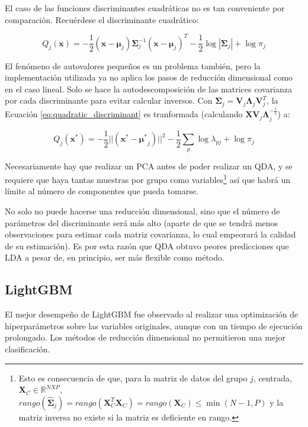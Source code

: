 \documentclass[12pt]{article}
\begin{document}
El caso de las funciones discriminantes cuadráticas no es tan conveniente por comparación. Recuérdese el discriminante cuadrático:

\begin{equation} \label{eq:quadratic_discriminant}
Q_j (\mathbf{x}) = - \frac{1}{2} (\mathbf{x} - \boldsymbol{\mu}_j) \boldsymbol{\Sigma}_j^{-1} (\mathbf{x} - \boldsymbol{\mu}_j)^T  - \frac{1}{2} \log |\boldsymbol{\Sigma}_j| + \log \pi_j
\end{equation}

El fenómeno de autovalores pequeños es un problema también, pero la implementación utilizada ya no aplica los pasos de reducción dimensional como en el caso lineal. Solo se hace la autodescomposición de las matrices covarianza por cada discriminante para evitar calcular inversos. Con $\boldsymbol{\Sigma}_j = \mathbf{V}_j \boldsymbol{\Lambda}_j \mathbf{V}_j^T$, la Ecuación \ref{eq:quadratic_discriminant} es tranformada (calculando $\mathbf{X} \mathbf{V}_j \boldsymbol{\Lambda}_j^{-\frac{1}{2}}$) a:

\begin{equation} \label{eq:quadratic_discriminant_proy}
Q_j (\mathbf{x}^{*}) = - \frac{1}{2} ||(\mathbf{x}^{*} - {\mathbf{\mu}^{*}}_j) ||^2   - \frac{1}{2} \sum_p \log \lambda_{pj} + \log \pi_j
\end{equation}

Necesariamente hay que realizar un PCA antes de poder realizar un QDA, y se requiere que haya tantas muestras por grupo como variables\footnote{Esto es consecuencia de que, para la matriz de datos del grupo $j$, centrada, $\mathbf{X}_C \in \mathbb{R}^{NXP}$, $rango(\hat{\boldsymbol{\Sigma}}_j) = rango(\mathbf{X}^T_C \mathbf{X}_C) = rango(\mathbf{X}_C) \le \min (N - 1,P)$ y la matriz inversa no existe si la matriz es deficiente en rango.} así que habrá un límite al número de componentes que pueda tomarse. 

No solo no puede hacerse una reducción dimensional, sino que el número de parámetros del discriminante será más alto (aparte de que se tendrá menos observaciones para estimar cada matriz covarianza, lo cual empeorará la calidad de su estimación). Es por esta razón que QDA obtuvo peores predicciones que LDA a pesar de, en principio, ser más flexible como método.

\subsection{LightGBM}

El mejor desempeño de LightGBM fue observado al realizar una optimización de hiperparámetros sobre las variables originales, aunque con un tiempo de ejecución prolongado. Los métodos de reducción dimensional no permitieron una mejor clasificación.
\end{document}
